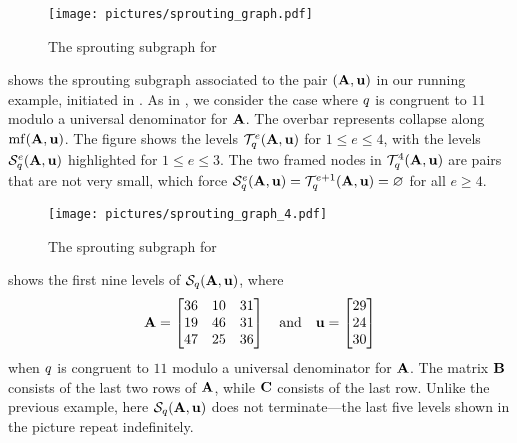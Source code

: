\documentclass{amsart}
\begin{document}
\newpage


\begin{example}
   \label{ex: ft.4}
   \begin{figure}
      \centering
      \texttt{[image: pictures/sprouting\_graph.pdf]}
      \caption{The sprouting subgraph for }
      \label{fig: sprouting graph}
   \end{figure}
    shows the sprouting subgraph associated to the pair $(\mathbf{A},\mathbf{u})$ in our running example, initiated in .
   As in , we consider the case where $q$ is congruent to $11$ modulo a universal denominator for $\mathbf{A}$.
   The overbar represents collapse along $\operatorname{mf}(\mathbf{A},\mathbf{u})$.
   The figure shows the levels $\mathcal{T}_{q}^e(\mathbf{A},\mathbf{u})$ for $1 \le e \le 4$, with the levels $\mathcal{S}_{q}^e(\mathbf{A},\mathbf{u})$ highlighted for $1 \leq e \leq 3$.
   The two framed nodes in $\mathcal{T}_{q}^4(\mathbf{A}, \mathbf{u})$ are pairs that are not very small, which force $\mathcal{S}_{q}^e(\mathbf{A},\mathbf{u}) = \mathcal{T}_{q}^{e+1}(\mathbf{A}, \mathbf{u}) = \varnothing$ for all $e \geq 4$.
\end{example}

\begin{example}
   \label{ex: new example}
   \begin{figure}
      \centering
      \texttt{[image: pictures/sprouting\_graph\_4.pdf]}
      \caption{The sprouting subgraph for }
      \label{fig: sprouting graph 2}
   \end{figure}
    shows the first nine levels of $\mathcal{S}_{q}(\mathbf{A},\mathbf{u})$, where
   \[
      \mathbf{A} = \begin{bmatrix} 36&10&31 \\ 19&46&31 \\ 47&25&36 \end{bmatrix}
      \quad\text{and} \quad
      \mathbf{u} =\begin{bmatrix} 29 \\ 24 \\ 30 \end{bmatrix}
   \]
   when $q$ is congruent to $11$ modulo a universal denominator for $\mathbf{A}$.
   The matrix $\mathbf{B}$ consists of the last two rows of $\mathbf{A}$, while $\mathbf{C}$ consists of the last row.
   Unlike the previous example, here $\mathcal{S}_{q}(\mathbf{A},\mathbf{u})$ does not terminate---the last five levels shown in the picture repeat indefinitely.
\end{example}
\end{document}
